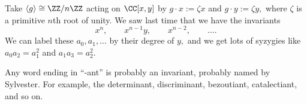 \documentclass[../notes.tex]{subfiles}
\begin{document}
\begin{example}
	Take $\langle g\rangle\cong\ZZ/n\ZZ$ acting on $\CC[x,y]$ by $g\cdot x:=\zeta x$ and $g\cdot y:=\zeta y,$ where $\zeta$ is a primitive $n$th root of unity. We saw last time that we have the invariants
	\[x^n,\qquad x^{n-1}y,\qquad x^{n-2},\qquad\ldots.\]
	We can label these $a_0,a_1,\ldots$ by their degree of $y,$ and we get lots of syzygies like $a_0a_2=a_1^2$ and $a_1a_3=a_2^2.$
\end{example}
\begin{remark}
	Any word ending in ``-ant'' is probably an invariant, probably named by Sylvester. For example, the determinant, discriminant, bezoutiant, catalectiant, and so on.
\end{remark}
\end{document}
